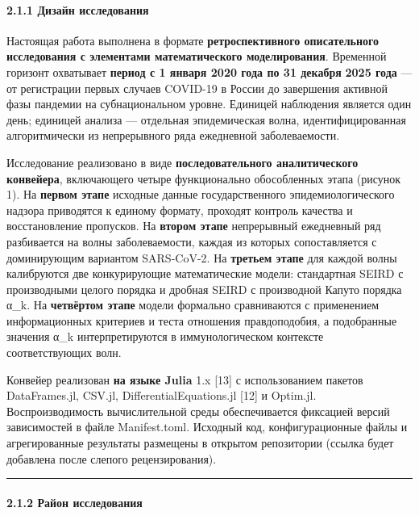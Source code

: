 \documentclass[12pt]{article}
\begin{document}
\paragraph{2.1.1 Дизайн
исследования}\label{ux434ux438ux437ux430ux439ux43d-ux438ux441ux441ux43bux435ux434ux43eux432ux430ux43dux438ux44f}

Настоящая работа выполнена в формате \textbf{ретроспективного
описательного} \textbf{исследования с элементами математического
моделирования}. Временной горизонт охватывает \textbf{период с 1 января
2020 года по 31 декабря} \textbf{2025 года} --- от регистрации первых
случаев COVID-19 в России до завершения активной фазы пандемии на
субнациональном уровне. Единицей наблюдения является один день; единицей
анализа --- отдельная эпидемическая волна, идентифицированная
алгоритмически из непрерывного ряда ежедневной заболеваемости.

Исследование реализовано в виде \textbf{последовательного
аналитического} \textbf{конвейера}, включающего четыре функционально
обособленных этапа (рисунок 1). На \textbf{первом этапе} исходные данные
государственного эпидемиологического надзора приводятся к единому
формату, проходят контроль качества и восстановление пропусков. На
\textbf{втором этапе} непрерывный ежедневный ряд разбивается на волны
заболеваемости, каждая из которых сопоставляется с доминирующим
вариантом SARS-CoV-2. На \textbf{третьем этапе} для каждой волны
калибруются две конкурирующие математические модели: стандартная SEIRD с
производными целого порядка и дробная SEIRD с производной Капуто порядка
α\_k. На \textbf{четвёртом этапе} модели формально сравниваются с
применением информационных критериев и теста отношения правдоподобия, а
подобранные значения α\_k интерпретируются в иммунологическом контексте
соответствующих волн.

Конвейер реализован \textbf{на языке Julia} 1.x {[}13{]} с
использованием пакетов DataFrames.jl, CSV.jl, DifferentialEquations.jl
{[}12{]} и Optim.jl. Воспроизводимость вычислительной среды
обеспечивается фиксацией версий зависимостей в файле Manifest.toml.
Исходный код, конфигурационные файлы и агрегированные результаты
размещены в открытом репозитории (ссылка будет добавлена после слепого
рецензирования).

\begin{center}\rule{0.5\linewidth}{0.5pt}\end{center}

\paragraph{2.1.2 Район
исследования}\label{ux440ux430ux439ux43eux43d-ux438ux441ux441ux43bux435ux434ux43eux432ux430ux43dux438ux44f}
\end{document}
